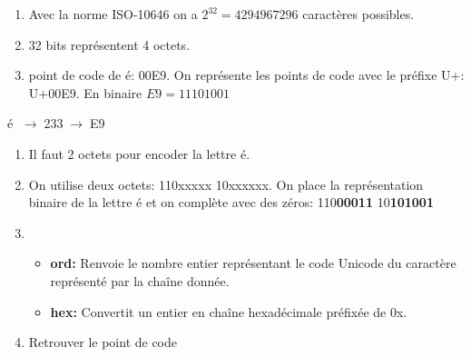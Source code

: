 \documentclass[a4paper,11pt]{article}
\begin{document}
\begin{Form}
\begin{activite}
\begin{enumerate}
\item Avec la norme ISO-10646 on a $2^{32}=4294967296$ caractères possibles.
\item 32 bits représentent 4 octets.
\item point de code de é: 00E9. On représente les points de code avec le préfixe U+: U+00E9. En binaire $E9 = 11101001$
\end{enumerate}
\end{activite}
\begin{commentprof}
é $\;\rightarrow\;$233$\;\rightarrow\;$E9
\end{commentprof}
\begin{activite}
\begin{enumerate}
\item Il faut 2 octets pour encoder la lettre é.
\item On utilise deux octets: 110xxxxx 10xxxxxx. On place la représentation binaire de la lettre é et on complète avec des zéros: 110\textbf{00011} 10\textbf{101001}
\item
\begin{itemize}
\item \textbf{ord:} Renvoie le nombre entier représentant le code Unicode du caractère représenté par la chaîne donnée. 
\item \textbf{hex:} Convertit un entier en chaîne hexadécimale préfixée de 0x.
\end{itemize}
\item Retrouver le point de code

\end{enumerate}
\end{activite}
\end{Form}
\end{document}
